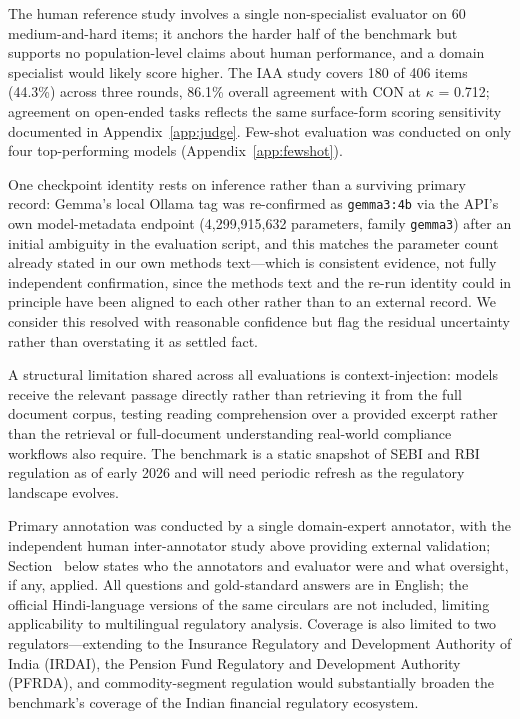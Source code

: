 The human reference study involves a single non-specialist evaluator on 60 medium-and-hard items; it
anchors the harder half of the benchmark but supports no population-level claims about human
performance, and a domain specialist would likely score higher. The IAA study covers 180 of 406
items (44.3\%) across three rounds, 86.1\% overall agreement with CON at $\kappa$ = 0.712; agreement on
open-ended tasks reflects the same surface-form scoring sensitivity documented in Appendix~\ref{app:judge}.
Few-shot evaluation was conducted on only four top-performing models (Appendix~\ref{app:fewshot}).

One checkpoint identity rests on inference rather than a surviving primary record: Gemma's local
Ollama tag was re-confirmed as \texttt{gemma3:4b} via the API's own model-metadata endpoint
(4,299,915,632 parameters, family \texttt{gemma3}) after an initial ambiguity in the evaluation
script, and this matches the parameter count already stated in our own methods text---which is
consistent evidence, not fully independent confirmation, since the methods text and the re-run
identity could in principle have been aligned to each other rather than to an external record. We
consider this resolved with reasonable confidence but flag the residual uncertainty rather than
overstating it as settled fact.

A structural limitation shared across all evaluations is context-injection: models receive the
relevant passage directly rather than retrieving it from the full document corpus, testing reading
comprehension over a provided excerpt rather than the retrieval or full-document understanding
real-world compliance workflows also require. The benchmark is a static snapshot of SEBI and RBI
regulation as of early 2026 and will need periodic refresh as the regulatory landscape evolves.

Primary annotation was conducted by a single domain-expert annotator, with the independent human
inter-annotator study above providing external validation; Section~
below states who the annotators and evaluator were and what oversight, if any, applied. All
questions and gold-standard answers are in English; the official Hindi-language versions of the same
circulars are not included, limiting applicability to multilingual regulatory analysis. Coverage is
also limited to two regulators---extending to the Insurance Regulatory and Development Authority of
India (IRDAI), the Pension Fund Regulatory and Development Authority (PFRDA), and commodity-segment
regulation would substantially broaden the benchmark's coverage of the Indian financial regulatory
ecosystem.

